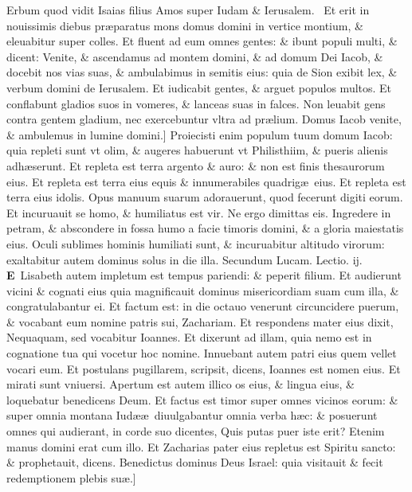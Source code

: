 \documentclass[a5paper,10pt]{book}
\def\ae{æ}
\begin{document}
\begin{multicols*}{2}
\vspace{-.5em}
Erbum quod vidit Isaias filius Amos super Iudam \& Ierusalem. \textdagger \ 
Et erit in nouissimis diebus pr\ae paratus mons domus domini in vertice montium, \& eleuabitur super colles.
Et fluent ad eum omnes gentes: \& ibunt populi multi, \& dicent: Venite, \& ascendamus ad montem domini, \& ad domum Dei Iacob, \& docebit nos vias suas, \& ambulabimus in semitis eius: quia de Sion exibit lex, \& verbum domini de Ierusalem.
Et iudicabit gentes, \& arguet populos multos. Et conflabunt gladios suos in vomeres, \& lanceas suas in falces.
Non leuabit gens contra gentem gladium, nec exercebuntur vltra ad pr\ae lium.
Domus Iacob venite, \& ambulemus in lumine domini.]
Proiecisti enim populum tuum domum Iacob: quia repleti sunt vt olim, \& augeres habuerunt vt Philisthiim, \& pueris alienis adh\ae serunt.
Et repleta est terra argento \& auro: \& non est finis thesaurorum eius. Et repleta est terra eius equis \& innumerabiles quadrig\ae \ eius. Et repleta est terra eius idolis.
Opus manuum suarum adorauerunt, quod fecerunt digiti eorum. Et incuruauit se homo, \& humiliatus est vir.
Ne ergo dimittas eis.
Ingredere in petram, \& abscondere in fossa humo a facie timoris domini, \& a gloria maiestatis eius.
Oculi sublimes hominis humiliati sunt, \& incuruabitur altitudo virorum: exaltabitur autem dominus solus in die illa.
\newline \color{red} Secundum Lucam. \hfill Lectio. ij.\color{black}
\vspace{-.25em}
\lettrine[lines=2]{\bfseries \color{red} E}{}\textdagger \ Lisabeth autem impletum est tempus pariendi: \& peperit filium.
Et audierunt vicini \& cognati eius quia magnificauit dominus misericordiam suam cum illa, \& congratulabantur ei.
Et factum est: in die octauo venerunt circuncidere puerum, \& vocabant eum nomine patris sui, Zachariam.
Et respondens mater eius dixit, Nequaquam, sed vocabitur Ioannes.
Et dixerunt ad illam, quia nemo est in cognatione tua qui vocetur hoc nomine.
Innuebant autem patri eius quem vellet vocari eum.
Et postulans pugillarem, scripsit, dicens, Ioannes est nomen eius. Et mirati sunt vniuersi.
Apertum est autem illico os eius, \& lingua eius, \& loquebatur benedicens Deum.
Et factus est timor super omnes vicinos eorum: \& super omnia montana Iud\ae \ae \ diuulgabantur omnia verba h\ae c: \& posuerunt omnes qui audierant, in corde suo dicentes, Quis putas puer iste erit? Etenim manus domini erat cum illo.
Et Zacharias pater eius repletus est Spiritu sancto: \& prophetauit, dicens.
Benedictus dominus Deus Israel: quia visitauit \& fecit redemptionem plebis su\ae .]

\end{multicols*}
\end{document}
